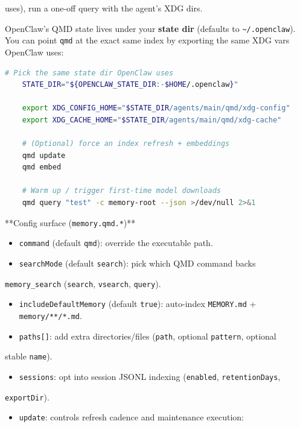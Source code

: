 uses), run a one-off query with the agent’s XDG dirs.

OpenClaw’s QMD state lives under your \textbf{state dir} (defaults to \texttt{\textasciitilde{}/.openclaw}).
You can point \texttt{qmd} at the exact same index by exporting the same XDG vars
OpenClaw uses:

\begin{lstlisting}[language=bash]
    # Pick the same state dir OpenClaw uses
    STATE_DIR="${OPENCLAW_STATE_DIR:-$HOME/.openclaw}"

    export XDG_CONFIG_HOME="$STATE_DIR/agents/main/qmd/xdg-config"
    export XDG_CACHE_HOME="$STATE_DIR/agents/main/qmd/xdg-cache"

    # (Optional) force an index refresh + embeddings
    qmd update
    qmd embed

    # Warm up / trigger first-time model downloads
    qmd query "test" -c memory-root --json >/dev/null 2>&1
\end{lstlisting}


**Config surface (\texttt{memory.qmd.*})**

\begin{itemize}
  \item \texttt{command} (default \texttt{qmd}): override the executable path.
  \item \texttt{searchMode} (default \texttt{search}): pick which QMD command backs
\end{itemize}

\texttt{memory\_search} (\texttt{search}, \texttt{vsearch}, \texttt{query}).
\begin{itemize}
  \item \texttt{includeDefaultMemory} (default \texttt{true}): auto-index \texttt{MEMORY.md} + \texttt{memory/**/*.md}.
  \item \texttt{paths[]}: add extra directories/files (\texttt{path}, optional \texttt{pattern}, optional
\end{itemize}

stable \texttt{name}).
\begin{itemize}
  \item \texttt{sessions}: opt into session JSONL indexing (\texttt{enabled}, \texttt{retentionDays},
\end{itemize}

\texttt{exportDir}).
\begin{itemize}
  \item \texttt{update}: controls refresh cadence and maintenance execution:
\end{itemize}

